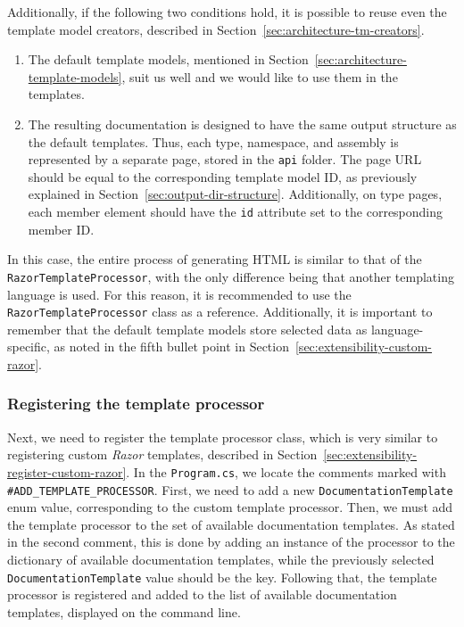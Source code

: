 Additionally, if the following two conditions hold, it is possible to reuse even the template model creators, described in Section~\ref{sec:architecture-tm-creators}.

\begin{enumerate}
    \item The default template models, mentioned in Section~\ref{sec:architecture-template-models}, suit us well and we would like to use them in the templates.
    \item The resulting documentation is designed to have the same output structure as the default templates. Thus, each type, namespace, and assembly is represented by a separate page, stored in the \texttt{api} folder. The page URL should be equal to the corresponding template model ID, as previously explained in Section~\ref{sec:output-dir-structure}.
    Additionally, on type pages, each member element should have the \texttt{id} attribute set to the corresponding member ID.
\end{enumerate}

In this case, the entire process of generating HTML is similar to that of the \texttt{RazorTemplateProcessor}, with the only difference being that another templating language is used.
For this reason, it is recommended to use the \texttt{RazorTemplate\-Processor} class as a reference.
Additionally, it is important to remember that the default template models store selected data as language-specific, as noted in the fifth bullet point in Section~\ref{sec:extensibility-custom-razor}.

\subsubsection{Registering the template processor}

Next, we need to register the template processor class, which is very similar to registering custom \textit{Razor} templates, described in Section~\ref{sec:extensibility-register-custom-razor}.
In the \texttt{Program.cs}, we locate the comments marked with \texttt{\#ADD\_TEMPLATE\_PROCESSOR}.
First, we need to add a new \texttt{DocumentationTemplate} enum value, corresponding to the custom template processor.
Then, we must add the template processor to the set of available documentation templates.
As stated in the second comment, this is done by adding an instance of the processor to the dictionary of available documentation templates, while the previously selected \texttt{DocumentationTemplate} value should be the key.
Following that, the template processor is registered and added to the list of available documentation templates, displayed on the command line.

